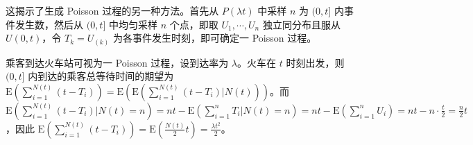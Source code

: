 \documentclass[../main.tex]{subfiles}
\begin{document}
这揭示了生成 Poisson 过程的另一种方法。首先从 $P(\lambda t)$ 中采样 $n$ 为 $(0,t]$ 内事件发生数，然后从 $(0,t]$ 中均匀采样 $n$ 个点，即取 $U_1,\cdots,U_n$ 独立同分布且服从 $U(0,t)$，令 $T_k=U_{(k)}$ 为各事件发生时刻，即可确定一 Poisson 过程。

\begin{example}
    乘客到达火车站可视为一 Poisson 过程，设到达率为 $\lambda$。火车在 $t$ 时刻出发，则 $(0,t]$ 内到达的乘客总等待时间的期望为 $\mathrm E(\sum_{i=1}^{N(t)}(t-T_i))=\mathrm E(\mathrm E(\sum_{i=1}^{N(t)}(t-T_i)|N(t)))$。而 $\mathrm E(\sum_{i=1}^{N(t)}(t-T_i)|N(t)=n)=nt-\mathrm E(\sum_{i=1}^nT_i|N(t)=n)=nt-\mathrm E(\sum_{i=1}^nU_i)=nt-n\cdot\frac t2=\frac n2t$，因此 $\mathrm E(\sum_{i=1}^{N(t)}(t-T_i))=\mathrm E(\frac{N(t)}2t)=\frac{\lambda t^2}2$。
\end{example}
\end{document}
